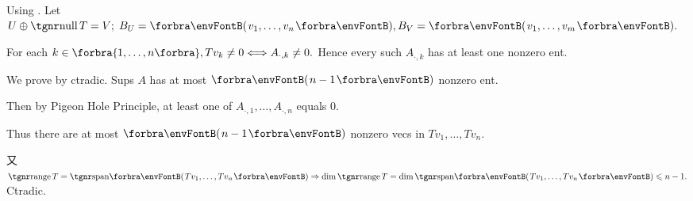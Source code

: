 
\par\quad
Using . Let $U\oplus\null T=V;\;B_U=\Par{v_1,\dots,v_n},B_V=\Par{v_1,\dots,v_m}.$\par\quad
For each $k\in\Bra{1,\dots,n},Tv_k\neq 0\Longleftrightarrow A_{\cdot,k}\neq 0.$ Hence every such $A_{\cdot,k}$ has at least one nonzero ent.\PfEnd\vspace{4pt}\par\quad
\Or We prove by ctradic. Sups $A$ has at most $\Par{n-1}$ nonzero ent.\par\quad
Then by Pigeon Hole Principle, at least one of $A_{\cdot,1},\dots,A_{\cdot,n}$ equals $0$.\par\quad
Thus there are at most $\Par{n-1}$ nonzero vecs in $Tv_{1},\dots,Tv_n.$\par\quad
又 $\range T=\Span{Tv_{1},\dots,Tv_n}\Rightarrow\dim\range T=\dim\Span{Tv_{1},\dots,Tv_n}\leqslant n-1.$ Ctradic.\PfEnd
\SepLine

